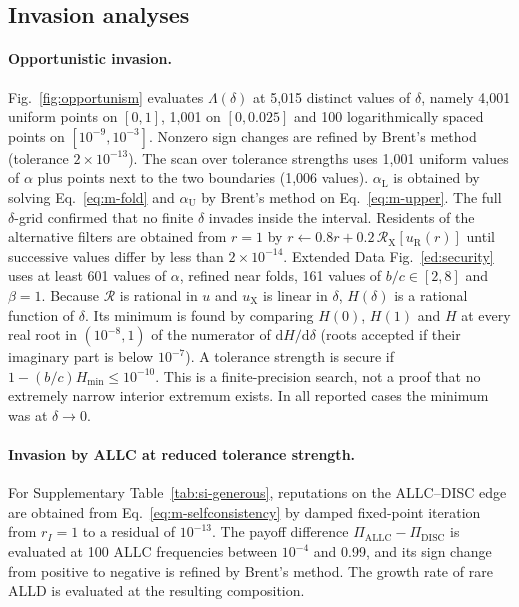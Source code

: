 \documentclass[10pt]{wlscirep}
\newcommand{\Rmap}{\mathscr{R}}            %
\newcommand{\uX}{u_{\mathrm{X}}}
\newcommand{\Hmin}{H_{\min}}
\newcommand{\dd}{\mathrm{d}}
\newcommand{\ALLC}{\mathrm{ALLC}}
\newcommand{\DISC}{\mathrm{DISC}}
\theoremstyle{plain}
\theoremstyle{remark}
\begin{document}
\subsection{Invasion analyses}

\paragraph{Opportunistic invasion.} Fig.~\ref{fig:opportunism} evaluates $\Lambda(\delta)$ at 5,015 distinct values of $\delta$, namely 4,001 uniform points on $[0,1]$, 1,001 on $[0,0.025]$ and 100 logarithmically spaced points on $[10^{-9},10^{-3}]$. Nonzero sign changes are refined by Brent's method (tolerance $2\times10^{-13}$). The scan over tolerance strengths uses 1,001 uniform values of $\alpha$ plus points next to the two boundaries (1,006 values). $\alpha_{\mathrm L}$ is obtained by solving Eq.~\eqref{eq:m-fold} and $\alpha_{\mathrm U}$ by Brent's method on Eq.~\eqref{eq:m-upper}. The full $\delta$-grid confirmed that no finite $\delta$ invades inside the interval. Residents of the alternative filters are obtained from $r=1$ by $r\leftarrow0.8r+0.2\,\Rmap_{\mathrm X}[u_{\mathrm R}(r)]$ until successive values differ by less than $2\times10^{-14}$. Extended Data Fig.~\ref{ed:security} uses at least 601 values of $\alpha$, refined near folds, 161 values of $b/c\in[2,8]$ and $\beta=1$. Because $\Rmap$ is rational in $u$ and $\uX$ is linear in $\delta$, $H(\delta)$ is a rational function of $\delta$. Its minimum is found by comparing $H(0)$, $H(1)$ and $H$ at every real root in $(10^{-8},1)$ of the numerator of $\dd H/\dd\delta$ (roots accepted if their imaginary part is below $10^{-7}$). A tolerance strength is secure if $1-(b/c)\Hmin\leq10^{-10}$. This is a finite-precision search, not a proof that no extremely narrow interior extremum exists. In all reported cases the minimum was at $\delta\to0$.

\paragraph{Invasion by ALLC at reduced tolerance strength.} For Supplementary Table~\ref{tab:si-generous}, reputations on the ALLC--DISC edge are obtained from Eq.~\eqref{eq:m-selfconsistency} by damped fixed-point iteration from $r_I=1$ to a residual of $10^{-13}$. The payoff difference $\Pi_{\ALLC}-\Pi_{\DISC}$ is evaluated at 100 ALLC frequencies between $10^{-4}$ and 0.99, and its sign change from positive to negative is refined by Brent's method. The growth rate of rare ALLD is evaluated at the resulting composition.
\end{document}
